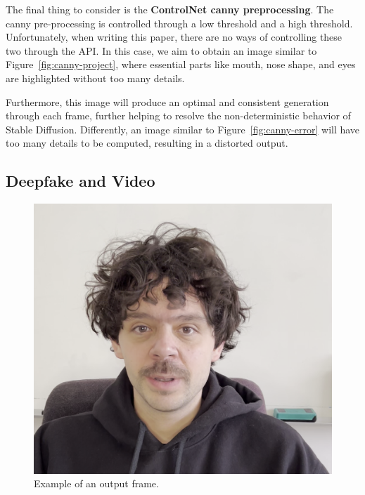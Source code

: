 \documentclass[preprint]{elsarticle}
\begin{document}
The final thing to consider is the \textbf{ControlNet canny preprocessing}. 
The canny pre-processing is controlled through a low threshold and a high threshold. 
Unfortunately, when writing this paper, there are no ways of  controlling these two through the API.
In this case, we aim to obtain an image similar to Figure~\ref{fig:canny-project},  where essential parts like mouth, nose shape, and eyes are highlighted without too many details. 

Furthermore, this image will produce an optimal and consistent generation through each frame, further helping to resolve the non-deterministic behavior of Stable Diffusion. Differently, an image similar to Figure~\ref{fig:canny-error} will have too many details to be computed, 
resulting in a distorted output.



\subsection{Deepfake and Video}

\begin{figure}[t]
	\centering
	\includegraphics[scale=0.15, keepaspectratio]{img/project_img/output.png}
	\caption{Example of an output frame.}
	\label{fig:output}
\end{figure}
\end{document}
